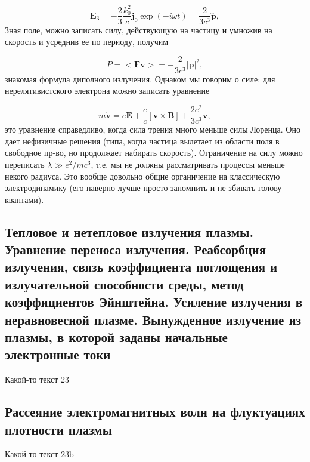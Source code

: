 \documentclass[10pt, a4paper]{article}
\numberwithin{equation}{section}
\begin{document}
\begin{equation}
    \mathbf{E}_3=-\frac{2}{3}\frac{k_0^2}{c}\mathbf{j}_0\exp(-i\omega t) = \frac{2}{3c^3} \dddot{\mathbf{p}},
\end{equation}
Зная поле, можно записать силу, действующую на частицу и умножив на скорость и усреднив ее по периоду, получим

\begin{equation}
    P=<\mathbf{F}\mathbf{v}>=-\frac{2}{3c^3}|\ddot{\mathbf{p}}|^2,
\end{equation}
знакомая формула диполного излучения. Однаком мы говорим о силе: для нерелятивистского электрона можно записать уравнение

\begin{equation}
    m\dot{\mathbf{v}}=e\mathbf{E}+\frac{e}{c}[\mathbf{v}\times\mathbf{B}] + \frac{2e^2}{3c^3}\ddot{\mathbf{v}},
\end{equation}
это уравнение справедливо, когда сила трения много меньше силы Лоренца. Оно дает нефизичные решения (типа, когда
частица вылетает из области поля в свободное пр-во, но продолжает набирать скорость). Ограничение на силу можно
переписать $\lambda \gg e^2/mc^3$, т.е. мы не должны рассматривать процессы меньше некого радиуса. Это вообще 
довольно общие органичение на классическую электродинамику (его наверно лучше просто запомнить и не збивать голову
квантами).




\subsection{Тепловое и нетепловое излучения плазмы. Уравнение переноса излучения. Реабсорбция излучения, связь коэффициента поглощения и излучательной способности среды, метод коэффициентов Эйнштейна. Усиление излучения в неравновесной плазме. Вынужденное излучение из плазмы, в которой заданы начальные электронные токи}

Какой-то текст 23

\subsection{Рассеяние электромагнитных волн на флуктуациях плотности плазмы}

Какой-то текст 23b

\newpage
{}


\end{document}

